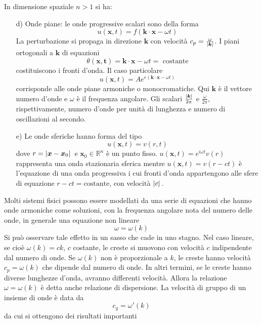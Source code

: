\documentclass[a4paper,12pt, draft]{article}
\theoremstyle{break}
\numberwithin{equation}{section}
\begin{document}
In dimensione spaziale \(n > 1\) si ha:
\begin{itemize}
  \item[d)] Onde piane: le onde progressive scalari sono della forma
  \[
    u(\bm{x}, t) = f(\bm{k}\cdot\bm{x} - \omega t) 
  \] 
  La perturbazione si propaga in direzione \(\bm{k}\) con velocità \(c_p = \frac{\omega}{\abs*{\bm{k}}}\). I piani ortogonali a \(\bm{k}\) di equazioni 
  \[
    \theta (\bm{x}, \bm{t}) = \bm{k} \cdot \bm{x} - \omega t = \mbox{ costante}
  \]
  costituiscono i fronti d'onda. Il caso particolare
  \[
    u(\bm{x}, t) = A e^{e(\bm{k}\cdot\bm{x} - \omega t)}
  \]
corrisponde alle onde piane armoniche o monocromatiche. Qui \(\bm{k}\) è il vettore numero d'onde e \(\omega\) è il frequenza angolare. Gli scalari \(\frac{\abs*{\bm{k}}}{2\pi}\) e \(\frac{\omega}{2\pi}\), rispettivamente, numero d'onde per unità di lunghezza e numero di oscillazioni al secondo.
\item[e)] Le onde sferiche hanno forma del tipo
\[
  u(\bm{x}, t) = v(r,t)
\]
dove \(r = \abs*{\bm{x} - \bm{x}_0}\) e \(\bm{x}_0 \in \mathbb{R}^n\) è un punto fisso. \(u(\bm{x}, t) = e^{i\omega t}v(r)\) rappresenta una onda stazionaria sferica mentre \(u(\bm{x}, t) = v(r - ct)\) è l'equazione di una onda progressiva i cui fronti d'onda appartengono alle sfere di equazione \(r - ct = \text{costante}\), con velocità \(\abs*{c}\).
\end{itemize}
Molti sistemi fisici possono essere modellati da una serie di equazioni che hanno onde armoniche come soluzioni, con la frequenza angolare nota del numero delle onde, in generale una equazione non lineare
\begin{equation}
  \omega = \omega(k)
\end{equation}
Si può osservare tale effetto in un sasso che cade in uno stagno. Nel caso lineare, se cioè \(\omega(k) = ck\), \(c\) costante, le creste si muovono con velocità \(c\) indipendente dal numero di onde. Se \(\omega(k)\) non è proporzionale a \(k\), le creste hanno velocità \(c_p = \omega(k)\) che dipende dal numero di onde. In altri termini, se le creste hanno diverse lunghezze d'onda, avranno differenti velocità. Allora la relazione \(\omega = \omega(k)\) è detta anche relazione di dispersione. La velocità di gruppo di un insieme di onde è data da 
\[
  c_g = \omega'(k)
\]
da cui si ottengono dei risultati importanti
\end{document}
